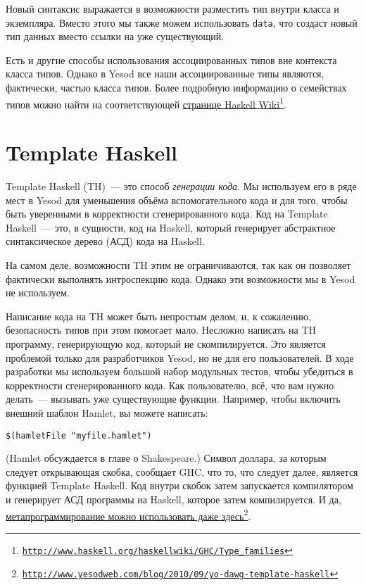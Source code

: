 Новый синтаксис выражается в возможности разместить тип внутри класса и экземпляра. Вместо этого мы также можем использовать \lstinline'data', что создаст новый тип данных вместо ссылки на уже существующий.

\begin{remark}
Есть и другие способы использования ассоциированных типов вне контекста класса типов. Однако в Yesod все наши ассоциированные типы являются, фактически, частью класса типов. Более подробную информацию о семействах типов можно найти на соответствующей \href{http://www.haskell.org/haskellwiki/GHC/Type\_families}{странице Haskell Wiki}\footnote{\href{http://www.haskell.org/haskellwiki/GHC/Type\_families}{\texttt{http://www.haskell.org/haskellwiki/GHC/Type\_families}}}.
\end{remark}

\section{Template Haskell}

Template Haskell (TH)~--- это способ \emph{генерации кода}. Мы используем его в ряде мест в Yesod для уменьшения объёма вспомогательного кода и для того, чтобы быть уверенными в корректности сгенерированного кода. Код на Template Haskell~--- это, в сущности, код на Haskell, который генерирует абстрактное синтаксическое дерево (АСД) кода на Haskell.

\begin{remark}
На самом деле, возможности TH этим не ограничиваются, так как он позволяет фактически выполнять интроспекцию кода. Однако эти возможности мы в Yesod не используем.
\end{remark}

Написание кода на TH может быть непростым делом, и, к сожалению, безопасность типов при этом помогает мало. Несложно написать на TH программу, генерирующую код, который не скомпилируется. Это является проблемой только для разработчиков Yesod, но не для его пользователей. В ходе разработки мы используем большой набор модульных тестов, чтобы убедиться в корректности сгенерированного кода. Как пользователю, всё, что вам нужно делать~--- вызывать уже существующие функции. Например, чтобы включить внешний шаблон Hamlet, вы можете написать:

\begin{lstlisting}
$(hamletFile "myfile.hamlet")
\end{lstlisting}

(Hamlet обсуждается в главе о Shakespeare.) Символ доллара, за которым следует открывающая скобка, сообщает GHC, что то, что следует далее, является функцией Template Haskell. Код внутри скобок затем запускается компилятором и генерирует АСД программы на Haskell, которое затем компилируется. И да, \href{http://www.yesodweb.com/blog/2010/09/yo-dawg-template-haskell}{метапрограммирование можно использовать даже здесь}\footnote{\href{http://www.yesodweb.com/blog/2010/09/yo-dawg-template-haskell}{\texttt{http://www.yesodweb.com/blog/2010/09/yo-dawg-template-haskell}}}.

